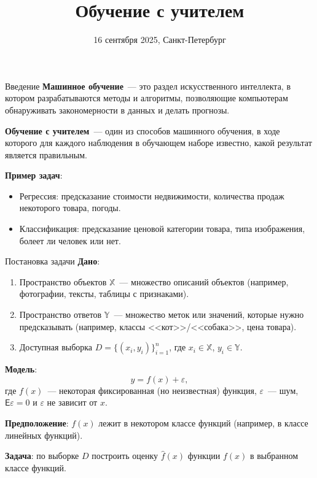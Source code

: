 \documentclass[notheorems, handout]{beamer}
\title[Статистическое и машинное обучение]{Обучение с учителем}
\institute[Санкт-Петербургский Государственный Университет]{%
	\small
	Санкт-Петербургский государственный университет\\
	Кафедра статистического моделирования
}
\date{16 сентября 2025, Санкт-Петербург}
\begin{document}
\begin{frame}
	\titlepage
\end{frame}

\begin{frame}{Введение}
	\textbf{Машинное обучение}~--- это раздел искусственного интеллекта, в котором разрабатываются методы и алгоритмы, позволяющие компьютерам обнаруживать закономерности в данных и делать прогнозы.\medskip

	\textbf{Обучение с учителем}~--- один из способов машинного обучения, в ходе которого для каждого наблюдения в обучающем наборе известно, какой результат является правильным.\medskip

	\textbf{Пример задач}:
	\begin{itemize}
		\item Регрессия: предсказание стоимости недвижимости, количества продаж некоторого товара, погоды.
		\item Классификация: предсказание ценовой категории товара, типа изображения, болеет ли человек или нет.
	\end{itemize}
\end{frame}

\begin{frame}{Постановка задачи}
	\textbf{Дано}:
	\begin{enumerate}
		\item Пространство объектов $\mathbb{X}$~--- множество описаний объектов (например, фотографии, тексты, таблицы с признаками).
		\item Пространство ответов $\mathbb{Y}$~--- множество меток или значений, которые нужно предсказывать (например, классы <<кот>>/<<собака>>, цена товара).
		\item Доступная выборка $D = \{(x_i, y_i)\}_{i=1}^n$, где $x_i\in \mathbb{X}$, $y_i\in \mathbb{Y}$.
	\end{enumerate}
	\textbf{Модель}:
	\[
		y=f(x) + \varepsilon,
	\]
	где $f(x)$~--- некоторая фиксированная (но неизвестная) функция, $\varepsilon$~--- шум, $\mathsf{E}\varepsilon=0$ и $\varepsilon$ не зависит от $x$.\medskip

	\textbf{Предположение}: $f(x)$ лежит в некотором классе функций (например, в классе линейных функций).\medskip

	\textbf{Задача}: по выборке $D$ построить оценку $\hat f(x)$ функции $f(x)$ в выбранном классе функций.
\end{frame}
\end{document}
